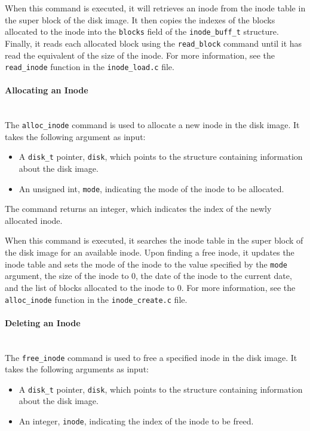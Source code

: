 \documentclass{article}
\begin{document}
When this command is executed, it will retrieves an inode from the inode table in the super block of the disk image. It then copies the indexes of the blocks allocated to the inode into the \texttt{blocks} field of the \texttt{inode\_buff\_t} structure. Finally, it reads each allocated block using the \texttt{read\_block} command until it has read the equivalent of the size of the inode. For more information, see the \texttt{read\_inode} function in the \texttt{inode\_load.c} file.

\paragraph{Allocating an Inode}\mbox{}\\
The \texttt{alloc\_inode} command is used to allocate a new inode in the disk image. It takes the following argument as input:

\begin{itemize}
    \item A \texttt{disk\_t} pointer, \texttt{disk}, which points to the structure containing information about the disk image.
    \item An unsigned int, \texttt{mode}, indicating the mode of the inode to be allocated.
\end{itemize}

The command returns an integer, which indicates the index of the newly allocated inode.

When this command is executed, it searches the inode table in the super block of the disk image for an available inode. Upon finding a free inode, it updates the inode table and sets the mode of the inode to the value specified by the \texttt{mode} argument, the size of the inode to 0, the date of the inode to the current date, and the list of blocks allocated to the inode to 0. For more information, see the \texttt{alloc\_inode} function in the \texttt{inode\_create.c} file.

\paragraph{Deleting an Inode}\mbox{}\\
The \texttt{free\_inode} command is used to free a specified inode in the disk image. It takes the following arguments as input:

\begin{itemize}
    \item A \texttt{disk\_t} pointer, \texttt{disk}, which points to the structure containing information about the disk image.
    \item An integer, \texttt{inode}, indicating the index of the inode to be freed.
\end{itemize}
\end{document}
